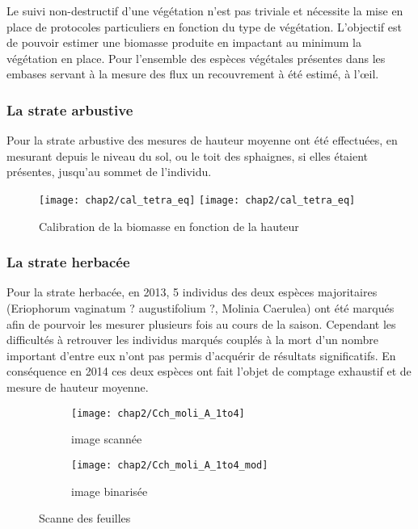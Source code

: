 Le suivi non-destructif d'une végétation n'est pas triviale et nécessite la mise en place de protocoles particuliers en fonction du type de végétation.
L'objectif est de pouvoir estimer une biomasse produite en impactant au minimum la végétation en place.
Pour l'ensemble des espèces végétales présentes dans les embases servant à la mesure des flux un recouvrement à été estimé, à l’œil.


\subsubsection{La strate arbustive}
Pour la strate arbustive des mesures de hauteur moyenne ont été effectuées, en mesurant depuis le niveau du sol, ou le toit des sphaignes, si elles étaient présentes, jusqu'au sommet de l'individu.
\begin{figure}
\texttt{[image: chap2/cal\_tetra\_eq]}
\texttt{[image: chap2/cal\_tetra\_eq]}
\caption{Calibration de la biomasse en fonction de la hauteur}
\label{fig:cal_arbu}
\end{figure}

\subsubsection{La strate herbacée}
Pour la strate herbacée, en 2013, 5 individus des deux espèces majoritaires (Eriophorum vaginatum ? augustifolium ?, Molinia Caerulea) ont été marqués afin de pourvoir les mesurer plusieurs fois au cours de la saison.
Cependant les difficultés à retrouver les individus marqués couplés à la mort d'un nombre important d'entre eux n'ont pas permis d'acquérir de résultats significatifs.
En conséquence en 2014 ces deux espèces ont fait l'objet de comptage exhaustif et de mesure de hauteur moyenne.


\begin{figure}
	\centering
	\begin{subfigure}[t]{0.5\textwidth}
		\centering
		\texttt{[image: chap2/Cch\_moli\_A\_1to4]}
		\caption{image scannée}
	\end{subfigure}%
	\begin{subfigure}[t]{0.5\textwidth}
		\centering
		\texttt{[image: chap2/Cch\_moli\_A\_1to4\_mod]}
		\caption{image binarisée}
	\end{subfigure}
\caption{Scanne des feuilles}
\label{fig:scan_mol}
\end{figure}


